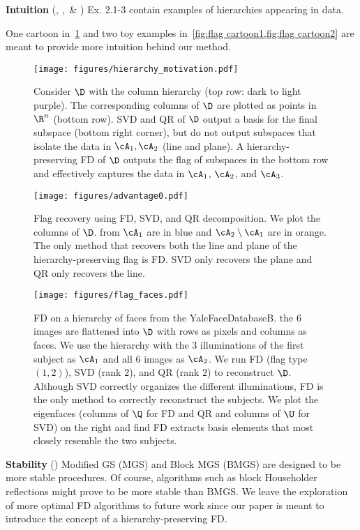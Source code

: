 \documentclass[10pt,twocolumn,letterpaper]{article}
\begin{document}
\noindent \textbf{Intuition} (\Rone, \Rtwo,~\& \Rfour) Ex. 2.1-3 contain examples of hierarchies appearing in data. 

One cartoon in~\cref{fig:flag cartoon} and two toy examples in~\cref{fig:flag cartoon1,fig:flag cartoon2} are meant to provide more intuition behind our method.
\begin{figure}[ht!]
    \centering
    \texttt{[image: figures/hierarchy\_motivation.pdf]}
    \caption{Consider $\D$ with the column hierarchy (top row: dark to light purple). The corresponding columns of $\D$ are plotted as points in $\R^n$ (bottom row). SVD and QR of $\D$ output a basis for the final subspace (bottom right corner), but do not output subspaces that isolate the data in $\cA_1, \cA_2$ (line and plane). A hierarchy-preserving FD of $\D$ outputs the flag of subspaces in the bottom row and effectively captures the data in $\cA_1$, $\cA_2$, and $\cA_3$.}
    \label{fig:flag cartoon}
\end{figure}

\begin{figure}[ht!]
    \centering
    \texttt{[image: figures/advantage0.pdf]}
    \caption{Flag recovery using FD, SVD, and QR decomposition. We plot the columns of $\D$. from $\cA_1$ are in blue and $\cA_2 \setminus \cA_1$ are in orange. The only method that recovers both the line and plane of the hierarchy-preserving flag is FD. SVD only recovers the plane and QR only recovers the line.}
    \label{fig:flag cartoon1}
\end{figure}

\begin{figure}[ht!]
    \centering
    \texttt{[image: figures/flag\_faces.pdf]}
    \caption{FD on a hierarchy of faces from the YaleFaceDatabaseB. the $6$ images are flattened into $\D$ with rows as pixels and columns as faces. We use the hierarchy with the $3$ illuminations of the first subject as $\cA_1$ and all $6$ images as $\cA_2$. We run FD (flag type $(1,2)$), SVD (rank $2$), and QR (rank $2$) to reconstruct $\D$. Although SVD correctly organizes the different illuminations, FD is the only method to correctly reconstruct the subjects. We plot the eigenfaces (columns of $\Q$ for FD and QR and columns of $\U$ for SVD) on the right and find FD extracts basis elements that most closely resemble the two subjects.}
    \label{fig:flag cartoon2}
\end{figure}

\noindent \textbf{Stability} (\Rone) Modified GS (MGS) and Block MGS (BMGS) are designed to be more stable procedures. Of course, algorithms such as block Householder reflections might prove to be more stable than BMGS. We leave the exploration of more optimal FD algorithms to future work since our paper is meant to introduce the concept of a hierarchy-preserving FD.
\end{document}
